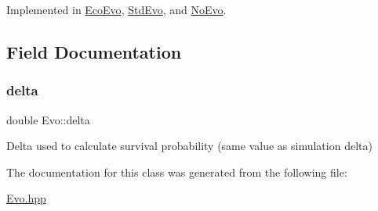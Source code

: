 Implemented in \hyperlink{classEcoEvo_adfd00eb377489649a279e567abc3ae94}{Eco\+Evo}, \hyperlink{classStdEvo_a6d4c64918a01dd00ad5185796b67e219}{Std\+Evo}, and \hyperlink{classNoEvo_ae404207f48accfa7ea9f0022ed1af187}{No\+Evo}.



\subsection{Field Documentation}
\mbox{\label{classEvo_a8f02598dfb1249ad135fbc741c27e0e0}} 
\subsubsection{\texorpdfstring{delta}{delta}}
{\footnotesize\ttfamily double Evo\+::delta\hspace{0.3cm}{\ttfamily [protected]}}

Delta used to calculate survival probability (same value as simulation delta) 

The documentation for this class was generated from the following file\+:\begin{DoxyCompactItemize}
\item 
\hyperlink{Evo_8hpp}{Evo.\+hpp}\end{DoxyCompactItemize}
